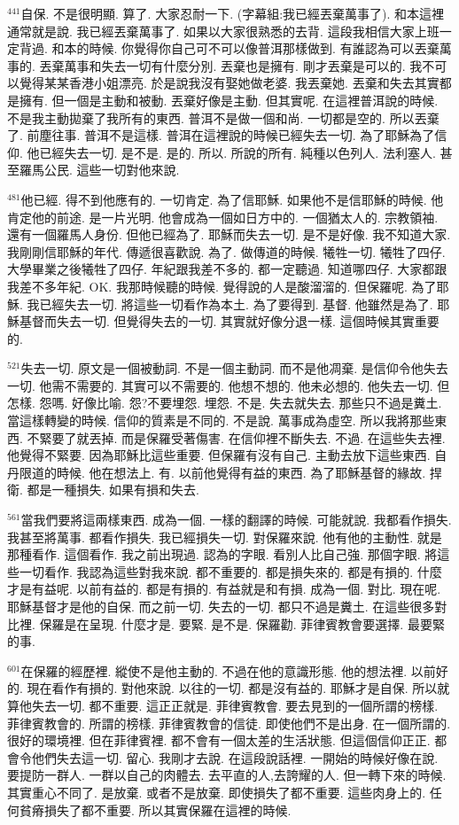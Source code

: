 \documentclass{book}
\begin{document}
$^{441}$自保.
不是很明顯.
算了.
大家忍耐一下.
(字幕組:我已經丟棄萬事了).
和本這裡通常就是說.
我已經丟棄萬事了.
如果以大家很熟悉的去背.
這段我相信大家上班一定背過.
和本的時候.
你覺得你自己可不可以像普洱那樣做到.
有誰認為可以丟棄萬事的.
丟棄萬事和失去一切有什麼分別.
丟棄也是擁有.
剛才丟棄是可以的.
我不可以覺得某某香港小姐漂亮.
於是說我沒有娶她做老婆.
我丟棄她.
丟棄和失去其實都是擁有.
但一個是主動和被動.
丟棄好像是主動.
但其實呢.
在這裡普洱說的時候.
不是我主動拋棄了我所有的東西.
普洱不是做一個和尚.
一切都是空的.
所以丟棄了.
前塵往事.
普洱不是這樣.
普洱在這裡說的時候已經失去一切.
為了耶穌為了信仰.
他已經失去一切.
是不是.
是的.
所以.
所說的所有.
純種以色列人.
法利塞人.
甚至羅馬公民.
這些一切對他來說.

$^{481}$他已經.
得不到他應有的.
一切肯定.
為了信耶穌.
如果他不是信耶穌的時候.
他肯定他的前途.
是一片光明.
他會成為一個如日方中的.
一個猶太人的.
宗教領袖.
還有一個羅馬人身份.
但他已經為了.
耶穌而失去一切.
是不是好像.
我不知道大家.
我剛剛信耶穌的年代.
傳遞很喜歡說.
為了.
做傳道的時候.
犧牲一切.
犧牲了四仔.
大學畢業之後犧牲了四仔.
年紀跟我差不多的.
都一定聽過.
知道哪四仔.
大家都跟我差不多年紀.
OK.
我那時候聽的時候.
覺得說的人是酸溜溜的.
但保羅呢.
為了耶穌.
我已經失去一切.
將這些一切看作為本土.
為了要得到.
基督.
他雖然是為了.
耶穌基督而失去一切.
但覺得失去的一切.
其實就好像分退一樣.
這個時候其實重要的.

$^{521}$失去一切.
原文是一個被動詞.
不是一個主動詞.
而不是他凋棄.
是信仰令他失去一切.
他需不需要的.
其實可以不需要的.
他想不想的.
他未必想的.
他失去一切.
但怎樣.
怨嗎.
好像比喻.
怨?不要埋怨.
埋怨.
不是.
失去就失去.
那些只不過是糞土.
當這樣轉變的時候.
信仰的質素是不同的.
不是說.
萬事成為虛空.
所以我將那些東西.
不緊要了就丟掉.
而是保羅受著傷害.
在信仰裡不斷失去.
不過.
在這些失去裡.
他覺得不緊要.
因為耶穌比這些重要.
但保羅有沒有自己.
主動去放下這些東西.
自丹限道的時候.
他在想法上.
有.
以前他覺得有益的東西.
為了耶穌基督的緣故.
捍衛.
都是一種損失.
如果有損和失去.

$^{561}$當我們要將這兩樣東西.
成為一個.
一樣的翻譯的時候.
可能就說.
我都看作損失.
我甚至將萬事.
都看作損失.
我已經損失一切.
對保羅來說.
他有他的主動性.
就是那種看作.
這個看作.
我之前出現過.
認為的字眼.
看別人比自己強.
那個字眼.
將這些一切看作.
我認為這些對我來說.
都不重要的.
都是損失來的.
都是有損的.
什麼才是有益呢.
以前有益的.
都是有損的.
有益就是和有損.
成為一個.
對比.
現在呢.
耶穌基督才是他的自保.
而之前一切.
失去的一切.
都只不過是糞土.
在這些很多對比裡.
保羅是在呈現.
什麼才是.
要緊.
是不是.
保羅勸.
菲律賓教會要選擇.
最要緊的事.

$^{601}$在保羅的經歷裡.
縱使不是他主動的.
不過在他的意識形態.
他的想法裡.
以前好的.
現在看作有損的.
對他來說.
以往的一切.
都是沒有益的.
耶穌才是自保.
所以就算他失去一切.
都不重要.
這正正就是.
菲律賓教會.
要去見到的一個所謂的榜樣.
菲律賓教會的.
所謂的榜樣.
菲律賓教會的信徒.
即使他們不是出身.
在一個所謂的.
很好的環境裡.
但在菲律賓裡.
都不會有一個太差的生活狀態.
但這個信仰正正.
都會令他們失去這一切.
留心.
我剛才去說.
在這段說話裡.
一開始的時候好像在說.
要提防一群人.
一群以自己的肉體去.
去平直的人,去誇耀的人.
但一轉下來的時候.
其實重心不同了.
是放棄.
或者不是放棄.
即使損失了都不重要.
這些肉身上的.
任何貧瘠損失了都不重要.
所以其實保羅在這裡的時候.
\end{document}
